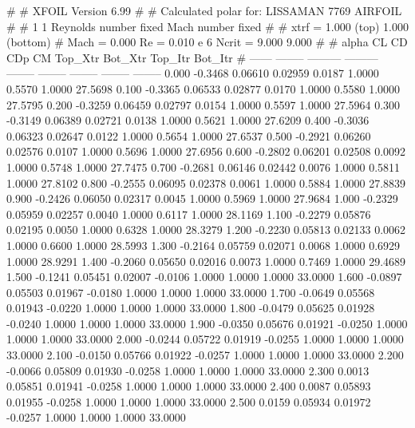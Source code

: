 #  
#       XFOIL         Version 6.99
#  
# Calculated polar for: LISSAMAN 7769 AIRFOIL                           
#  
# 1 1 Reynolds number fixed          Mach number fixed         
#  
# xtrf =   1.000 (top)        1.000 (bottom)  
# Mach =   0.000     Re =     0.010 e 6     Ncrit =   9.000  9.000
#  
#   alpha    CL        CD       CDp       CM     Top_Xtr  Bot_Xtr  Top_Itr  Bot_Itr
#  ------ -------- --------- --------- -------- -------- -------- -------- --------
   0.000  -0.3468   0.06610   0.02959   0.0187   1.0000   0.5570   1.0000  27.5698
   0.100  -0.3365   0.06533   0.02877   0.0170   1.0000   0.5580   1.0000  27.5795
   0.200  -0.3259   0.06459   0.02797   0.0154   1.0000   0.5597   1.0000  27.5964
   0.300  -0.3149   0.06389   0.02721   0.0138   1.0000   0.5621   1.0000  27.6209
   0.400  -0.3036   0.06323   0.02647   0.0122   1.0000   0.5654   1.0000  27.6537
   0.500  -0.2921   0.06260   0.02576   0.0107   1.0000   0.5696   1.0000  27.6956
   0.600  -0.2802   0.06201   0.02508   0.0092   1.0000   0.5748   1.0000  27.7475
   0.700  -0.2681   0.06146   0.02442   0.0076   1.0000   0.5811   1.0000  27.8102
   0.800  -0.2555   0.06095   0.02378   0.0061   1.0000   0.5884   1.0000  27.8839
   0.900  -0.2426   0.06050   0.02317   0.0045   1.0000   0.5969   1.0000  27.9684
   1.000  -0.2329   0.05959   0.02257   0.0040   1.0000   0.6117   1.0000  28.1169
   1.100  -0.2279   0.05876   0.02195   0.0050   1.0000   0.6328   1.0000  28.3279
   1.200  -0.2230   0.05813   0.02133   0.0062   1.0000   0.6600   1.0000  28.5993
   1.300  -0.2164   0.05759   0.02071   0.0068   1.0000   0.6929   1.0000  28.9291
   1.400  -0.2060   0.05650   0.02016   0.0073   1.0000   0.7469   1.0000  29.4689
   1.500  -0.1241   0.05451   0.02007  -0.0106   1.0000   1.0000   1.0000  33.0000
   1.600  -0.0897   0.05503   0.01967  -0.0180   1.0000   1.0000   1.0000  33.0000
   1.700  -0.0649   0.05568   0.01943  -0.0220   1.0000   1.0000   1.0000  33.0000
   1.800  -0.0479   0.05625   0.01928  -0.0240   1.0000   1.0000   1.0000  33.0000
   1.900  -0.0350   0.05676   0.01921  -0.0250   1.0000   1.0000   1.0000  33.0000
   2.000  -0.0244   0.05722   0.01919  -0.0255   1.0000   1.0000   1.0000  33.0000
   2.100  -0.0150   0.05766   0.01922  -0.0257   1.0000   1.0000   1.0000  33.0000
   2.200  -0.0066   0.05809   0.01930  -0.0258   1.0000   1.0000   1.0000  33.0000
   2.300   0.0013   0.05851   0.01941  -0.0258   1.0000   1.0000   1.0000  33.0000
   2.400   0.0087   0.05893   0.01955  -0.0258   1.0000   1.0000   1.0000  33.0000
   2.500   0.0159   0.05934   0.01972  -0.0257   1.0000   1.0000   1.0000  33.0000
